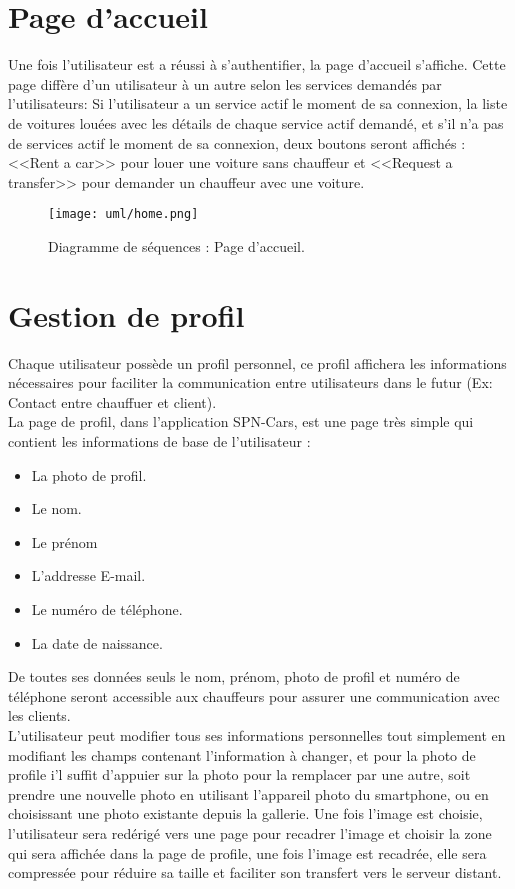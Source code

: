 \section{Page d'accueil}
Une fois l'utilisateur est a réussi à s'authentifier, la page d'accueil s'affiche. Cette page diffère d'un utilisateur à un autre selon les services demandés par l'utilisateurs: Si l'utilisateur a un service actif le moment de sa connexion, la liste de voitures louées avec les détails de chaque service actif demandé, et s'il n'a pas de services actif le moment de sa connexion, deux boutons seront affichés : <<Rent a car>> pour louer une voiture sans chauffeur et <<Request a transfer>> pour demander un chauffeur avec une voiture.
\begin{figure}[H]
    \centering
    \texttt{[image: uml/home.png]}
    \vspace{.5cm}
    \caption{Diagramme de séquences : Page d'accueil.}
    \label{fig:seq_home}
\end{figure}
\vspace{.5cm}
\section{Gestion de profil}
Chaque utilisateur possède un profil personnel, ce profil affichera les informations nécessaires pour faciliter la communication entre utilisateurs dans le futur (Ex: Contact entre chauffuer et client).\\
\noindent La page de profil, dans l'application SPN-Cars, est une page très simple qui contient les informations de base de l'utilisateur :
\begin{itemize}
    \item La photo de profil.
    \item Le nom.
    \item Le prénom
    \item L'addresse E-mail.
    \item Le numéro de téléphone.
    \item La date de naissance.
\end{itemize}
De toutes ses données seuls le nom, prénom, photo de profil et numéro de téléphone seront accessible aux chauffeurs pour assurer une communication avec les clients.\\
\noindent L'utilisateur peut modifier tous ses informations personnelles tout simplement en modifiant les champs contenant l'information à changer, et pour la photo de profile i'l suffit d'appuier sur la photo pour la remplacer par une autre, soit prendre une nouvelle photo en utilisant l'appareil photo du smartphone, ou en choisissant une photo existante depuis la gallerie. Une fois l'image est choisie, l'utilisateur sera redérigé vers une page pour recadrer l'image et choisir la zone qui sera affichée dans la page de profile, une fois l'image est recadrée, elle sera compressée pour réduire sa taille et faciliter son transfert vers le serveur distant.
